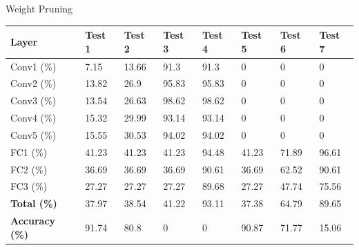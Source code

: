 \begin{frame}{Weight Pruning}
	\begin{table}[H]
		\centering
		\begin{tabular}{llll llll}
			\toprule
			\textbf{Layer}         & \textbf{Test 1} & \textbf{Test 2} & \textbf{Test 3} & \textbf{Test 4} & \textbf{Test 5} & \textbf{Test 6} & \textbf{Test 7} \\
			\midrule
			Conv1 (\%)             & 7.15            & 13.66           & 91.3            & 91.3            & 0               & 0               & 0               \\
			Conv2 (\%)             & 13.82           & 26.9            & 95.83           & 95.83           & 0               & 0               & 0               \\
			Conv3 (\%)             & 13.54           & 26.63           & 98.62           & 98.62           & 0               & 0               & 0               \\
			Conv4 (\%)             & 15.32           & 29.99           & 93.14           & 93.14           & 0               & 0               & 0               \\
			Conv5 (\%)             & 15.55           & 30.53           & 94.02           & 94.02           & 0               & 0               & 0               \\
			FC1 (\%)               & 41.23           & 41.23           & 41.23           & 94.48           & 41.23           & 71.89           & 96.61           \\
			FC2 (\%)               & 36.69           & 36.69           & 36.69           & 90.61           & 36.69           & 62.52           & 90.61           \\
			FC3 (\%)               & 27.27           & 27.27           & 27.27           & 89.68           & 27.27           & 47.74           & 75.56           \\
			\midrule
			\textbf{Total (\%)}    & 37.97           & 38.54           & 41.22           & 93.11           & 37.38           & 64.79           & 89.65           \\
			\midrule
			\textbf{Accuracy (\%)} & 91.74           & 80.8            & 0               & 0               & 90.87           & 71.77           & 15.06           \\
			\bottomrule
		\end{tabular}
	\end{table}
\end{frame}


